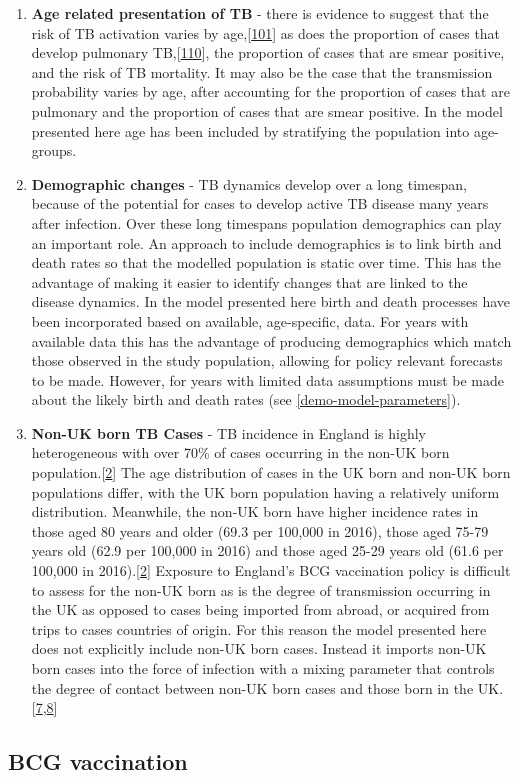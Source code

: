 \documentclass[11pt,twoside]{bristolthesis}
\begin{document}
\begin{enumerate}
  \item
    \textbf{Age related presentation of TB} - there is evidence to suggest that the risk of TB activation varies by age,{[}\protect\hyperlink{ref-Ragonnet2017}{101}{]} as does the proportion of cases that develop pulmonary TB,{[}\protect\hyperlink{ref-Lefebvre2017}{110}{]}, the proportion of cases that are smear positive, and the risk of TB mortality. It may also be the case that the transmission probability varies by age, after accounting for the proportion of cases that are pulmonary and the proportion of cases that are smear positive. In the model presented here age has been included by stratifying the population into age-groups.
  \item
    \textbf{Demographic changes} - TB dynamics develop over a long timespan, because of the potential for cases to develop active TB disease many years after infection. Over these long timespans population demographics can play an important role. An approach to include demographics is to link birth and death rates so that the modelled population is static over time. This has the advantage of making it easier to identify changes that are linked to the disease dynamics. In the model presented here birth and death processes have been incorporated based on available, age-specific, data. For years with available data this has the advantage of producing demographics which match those observed in the study population, allowing for policy relevant forecasts to be made. However, for years with limited data assumptions must be made about the likely birth and death rates (see \ref{demo-model-parameters}).
  \item
    \textbf{Non-UK born TB Cases} - TB incidence in England is highly heterogeneous with over 70\% of cases occurring in the non-UK born population.{[}\protect\hyperlink{ref-PHE2017}{2}{]} The age distribution of cases in the UK born and non-UK born populations differ, with the UK born population having a relatively uniform distribution. Meanwhile, the non-UK born have higher incidence rates in those aged 80 years and older (69.3 per 100,000 in 2016), those aged 75-79 years old (62.9 per 100,000 in 2016) and those aged 25-29 years old (61.6 per 100,000 in 2016).{[}\protect\hyperlink{ref-PHE2017}{2}{]} Exposure to England's BCG vaccination policy is difficult to assess for the non-UK born as is the degree of transmission occurring in the UK as opposed to cases being imported from abroad, or acquired from trips to cases countries of origin. For this reason the model presented here does not explicitly include non-UK born cases. Instead it imports non-UK born cases into the force of infection with a mixing parameter that controls the degree of contact between non-UK born cases and those born in the UK.{[}\protect\hyperlink{ref-Anderson1991}{7},\protect\hyperlink{ref-Keeling2007}{8}{]}
  \end{enumerate}
  \hypertarget{bcg-vaccination}{%
  \subsection{BCG vaccination}\label{bcg-vaccination}}
  
\end{document}
